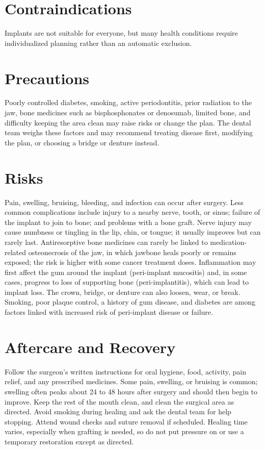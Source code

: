 \section*{Contraindications}
Implants are not suitable for everyone, but many health conditions require individualized planning rather than an automatic exclusion.

\section*{Precautions}
Poorly controlled diabetes, smoking, active periodontitis, prior radiation to the jaw, bone medicines such as bisphosphonates or denosumab, limited bone, and difficulty keeping the area clean may raise risks or change the plan. The dental team weighs these factors and may recommend treating disease first, modifying the plan, or choosing a bridge or denture instead.

\section*{Risks}
Pain, swelling, bruising, bleeding, and infection can occur after surgery. Less common complications include injury to a nearby nerve, tooth, or sinus; failure of the implant to join to bone; and problems with a bone graft. Nerve injury may cause numbness or tingling in the lip, chin, or tongue; it usually improves but can rarely last. Antiresorptive bone medicines can rarely be linked to medication-related osteonecrosis of the jaw, in which jawbone heals poorly or remains exposed; the risk is higher with some cancer treatment doses. Inflammation may first affect the gum around the implant (peri-implant mucositis) and, in some cases, progress to loss of supporting bone (peri-implantitis), which can lead to implant loss. The crown, bridge, or denture can also loosen, wear, or break. Smoking, poor plaque control, a history of gum disease, and diabetes are among factors linked with increased risk of peri-implant disease or failure.

\section*{Aftercare and Recovery}
Follow the surgeon's written instructions for oral hygiene, food, activity, pain relief, and any prescribed medicines. Some pain, swelling, or bruising is common; swelling often peaks about 24 to 48 hours after surgery and should then begin to improve. Keep the rest of the mouth clean, and clean the surgical area as directed. Avoid smoking during healing and ask the dental team for help stopping. Attend wound checks and suture removal if scheduled. Healing time varies, especially when grafting is needed, so do not put pressure on or use a temporary restoration except as directed.

